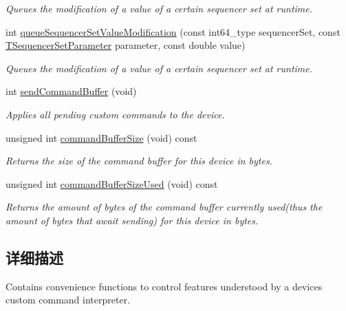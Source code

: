 \begin{DoxyCompactItemize}
\begin{DoxyCompactList}\small\item\em Queues the modification of a value of a certain sequencer set at runtime. \end{DoxyCompactList}\item 
int \hyperlink{classmv_i_m_p_a_c_t_1_1acquire_1_1_gen_i_cam_1_1_custom_command_generator_a8ef48e0bf3d3c9a7dcce38f635142d87}{queue\+Sequencer\+Set\+Value\+Modification} (const int64\+\_\+type sequencer\+Set, const \hyperlink{group___gen_i_cam_interface_ga458c2281fb19ba32fa6a49b02e0a976d}{T\+Sequencer\+Set\+Parameter} parameter, const double value)
\begin{DoxyCompactList}\small\item\em Queues the modification of a value of a certain sequencer set at runtime. \end{DoxyCompactList}\item 
int \hyperlink{classmv_i_m_p_a_c_t_1_1acquire_1_1_gen_i_cam_1_1_custom_command_generator_afcaaa076529735eb7fd4eb476776f18d}{send\+Command\+Buffer} (void)
\begin{DoxyCompactList}\small\item\em Applies all pending custom commands to the device. \end{DoxyCompactList}\item 
unsigned int \hyperlink{classmv_i_m_p_a_c_t_1_1acquire_1_1_gen_i_cam_1_1_custom_command_generator_a54e96fde36fbe4ee7ff9f85a52edec90}{command\+Buffer\+Size} (void) const 
\begin{DoxyCompactList}\small\item\em Returns the size of the command buffer for this device in bytes. \end{DoxyCompactList}\item 
unsigned int \hyperlink{classmv_i_m_p_a_c_t_1_1acquire_1_1_gen_i_cam_1_1_custom_command_generator_a25934409fe9fe3abc5200225f8fad6fe}{command\+Buffer\+Size\+Used} (void) const 
\begin{DoxyCompactList}\small\item\em Returns the amount of bytes of the command buffer currently used(thus the amount of bytes that await sending) for this device in bytes. \end{DoxyCompactList}\end{DoxyCompactItemize}


\subsection{详细描述}
Contains convenience functions to control features understood by a devices custom command interpreter. 

